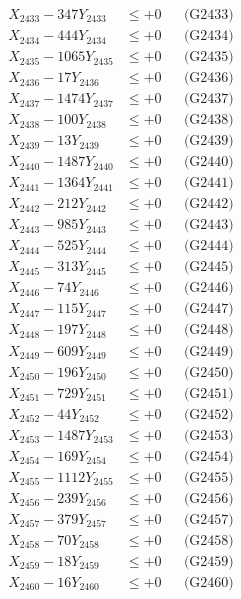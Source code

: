 \documentclass[a4paper,10pt]{article}
\begin{document}
{\begin{align}
X_{2433} - 347Y_{2433} &\leq +0 && \text{(G2433)} \\
X_{2434} - 444Y_{2434} &\leq +0 && \text{(G2434)} \\
X_{2435} - 1065Y_{2435} &\leq +0 && \text{(G2435)} \\
X_{2436} - 17Y_{2436} &\leq +0 && \text{(G2436)} \\
X_{2437} - 1474Y_{2437} &\leq +0 && \text{(G2437)} \\
X_{2438} - 100Y_{2438} &\leq +0 && \text{(G2438)} \\
X_{2439} - 13Y_{2439} &\leq +0 && \text{(G2439)} \\
X_{2440} - 1487Y_{2440} &\leq +0 && \text{(G2440)} \\
\allowbreak
X_{2441} - 1364Y_{2441} &\leq +0 && \text{(G2441)} \\
X_{2442} - 212Y_{2442} &\leq +0 && \text{(G2442)} \\
X_{2443} - 985Y_{2443} &\leq +0 && \text{(G2443)} \\
X_{2444} - 525Y_{2444} &\leq +0 && \text{(G2444)} \\
X_{2445} - 313Y_{2445} &\leq +0 && \text{(G2445)} \\
X_{2446} - 74Y_{2446} &\leq +0 && \text{(G2446)} \\
X_{2447} - 115Y_{2447} &\leq +0 && \text{(G2447)} \\
X_{2448} - 197Y_{2448} &\leq +0 && \text{(G2448)} \\
X_{2449} - 609Y_{2449} &\leq +0 && \text{(G2449)} \\
X_{2450} - 196Y_{2450} &\leq +0 && \text{(G2450)} \\
\allowbreak
X_{2451} - 729Y_{2451} &\leq +0 && \text{(G2451)} \\
X_{2452} - 44Y_{2452} &\leq +0 && \text{(G2452)} \\
X_{2453} - 1487Y_{2453} &\leq +0 && \text{(G2453)} \\
X_{2454} - 169Y_{2454} &\leq +0 && \text{(G2454)} \\
X_{2455} - 1112Y_{2455} &\leq +0 && \text{(G2455)} \\
X_{2456} - 239Y_{2456} &\leq +0 && \text{(G2456)} \\
X_{2457} - 379Y_{2457} &\leq +0 && \text{(G2457)} \\
X_{2458} - 70Y_{2458} &\leq +0 && \text{(G2458)} \\
X_{2459} - 18Y_{2459} &\leq +0 && \text{(G2459)} \\
X_{2460} - 16Y_{2460} &\leq +0 && \text{(G2460)} \\

\end{align}}
\end{document}
